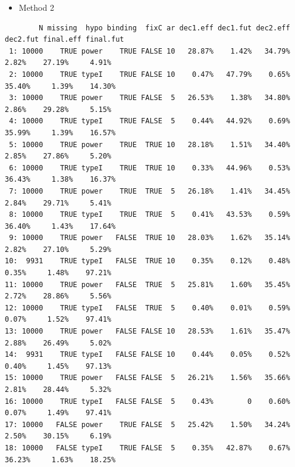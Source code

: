 \documentclass[12pt]{article}
\begin{document}
\begin{itemize}
\item Method 2
\end{itemize}
\begin{verbatim}
        N missing  hypo binding  fixC ar dec1.eff dec1.fut dec2.eff dec2.fut final.eff final.fut
 1: 10000    TRUE power    TRUE FALSE 10   28.87%    1.42%   34.79%    2.82%    27.19%     4.91%
 2: 10000    TRUE typeI    TRUE FALSE 10    0.47%   47.79%    0.65%   35.40%     1.39%    14.30%
 3: 10000    TRUE power    TRUE FALSE  5   26.53%    1.38%   34.80%    2.86%    29.28%     5.15%
 4: 10000    TRUE typeI    TRUE FALSE  5    0.44%   44.92%    0.69%   35.99%     1.39%    16.57%
 5: 10000    TRUE power    TRUE  TRUE 10   28.18%    1.51%   34.40%    2.85%    27.86%     5.20%
 6: 10000    TRUE typeI    TRUE  TRUE 10    0.33%   44.96%    0.53%   36.43%     1.38%    16.37%
 7: 10000    TRUE power    TRUE  TRUE  5   26.18%    1.41%   34.45%    2.84%    29.71%     5.41%
 8: 10000    TRUE typeI    TRUE  TRUE  5    0.41%   43.53%    0.59%   36.40%     1.43%    17.64%
 9: 10000    TRUE power   FALSE  TRUE 10   28.03%    1.62%   35.14%    2.82%    27.10%     5.29%
10:  9931    TRUE typeI   FALSE  TRUE 10    0.35%    0.12%    0.48%    0.35%     1.48%    97.21%
11: 10000    TRUE power   FALSE  TRUE  5   25.81%    1.60%   35.45%    2.72%    28.86%     5.56%
12: 10000    TRUE typeI   FALSE  TRUE  5    0.40%    0.01%    0.59%    0.07%     1.52%    97.41%
13: 10000    TRUE power   FALSE FALSE 10   28.53%    1.61%   35.47%    2.88%    26.49%     5.02%
14:  9931    TRUE typeI   FALSE FALSE 10    0.44%    0.05%    0.52%    0.40%     1.45%    97.13%
15: 10000    TRUE power   FALSE FALSE  5   26.21%    1.56%   35.66%    2.81%    28.44%     5.32%
16: 10000    TRUE typeI   FALSE FALSE  5    0.43%        0    0.60%    0.07%     1.49%    97.41%
17: 10000   FALSE power    TRUE FALSE  5   25.42%    1.50%   34.24%    2.50%    30.15%     6.19%
18: 10000   FALSE typeI    TRUE FALSE  5    0.35%   42.87%    0.67%   36.23%     1.63%    18.25%
\end{verbatim}

\clearpage
\end{document}
